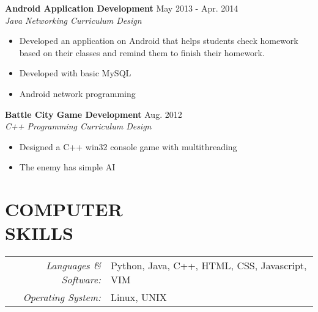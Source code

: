 \documentclass[margin,10pt]{res} %
\begin{document}
\begin{resume}
{\bf Android Application Development} \hfill May 2013 - Apr. 2014 \\
\textit{Java Networking Curriculum Design}
\begin{itemize}
\item Developed an application on Android that helps students check homework based on their classes and remind them to finish their homework.
\item Developed with basic MySQL
\item Android network programming
\end{itemize}

{\bf Battle City Game Development} \hfill Aug. 2012 \\
\textit{C++ Programming Curriculum Design}
\begin{itemize}  %
\item Designed a C++ win32 console game with multithreading
\item The enemy has simple AI
\end{itemize}



\section{COMPUTER \\ SKILLS}
\begin{tabular}{rl}
{\sl Languages \& Software:}
& Python, Java, C++, HTML, CSS, Javascript, VIM \\
{\sl Operating System:}
& Linux, UNIX\\
\end{tabular}



\end{resume}
\end{document}

